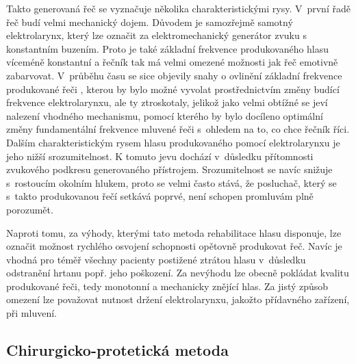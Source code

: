 
Takto generovaná řeč se vyznačuje několika charakteristickými rysy. V~první
řadě řeč budí velmi mechanický dojem. Důvodem je samozřejmě samotný
elektrolarynx, který lze označit za elektromechanický generátor zvuku s
konstantním buzením. Proto je také základní frekvence produkovaného hlasu víceméně konstantní a řečník tak má velmi omezené možnosti jak řeč emotivně zabarvovat. V~průběhu času se sice objevily snahy o ovlinění základní frekvence produkované řeči \cite{Kikuchi2004, Uemi1994, Goldstein2004}, kterou by bylo možné vyvolat prostřednictvím změny budící frekvence elektrolarynxu, ale ty ztroskotaly, jelikož jako velmi obtížné se jeví nalezení vhodného mechanismu, pomocí kterého by bylo docíleno optimální změny fundamentální frekvence mluvené řeči s~ohledem na to, co chce řečník říci. Dalším charakteristickým rysem hlasu produkovaného pomocí elektrolarynxu je jeho nižší srozumitelnost. K tomuto jevu dochází v~důsledku přítomnosti zvukového podkresu generovaného přístrojem. Srozumitelnost se navíc snižuje s~rostoucím okolním hlukem, proto se velmi často stává, že posluchač, který se s~takto produkovanou řečí setkává poprvé, není schopen promluvám plně porozumět.

Naproti tomu, za výhody, kterými tato metoda rehabilitace hlasu disponuje, lze označit možnost rychlého
osvojení schopnosti opětovně produkovat řeč. Navíc je vhodná pro téměř všechny pacienty
postižené ztrátou hlasu v~důsledku odstranění hrtanu popř. jeho poškození.
Za nevýhodu lze obecně pokládat kvalitu produkované řeči, tedy monotonní a
mechanicky znějící hlas. Za jistý způsob omezení lze považovat nutnost držení elektrolarynxu, jakožto přídavného zařízení, při mluvení.




\subsection{Chirurgicko-protetická metoda} %
\label{chap:cause:treatment:tracheo}

